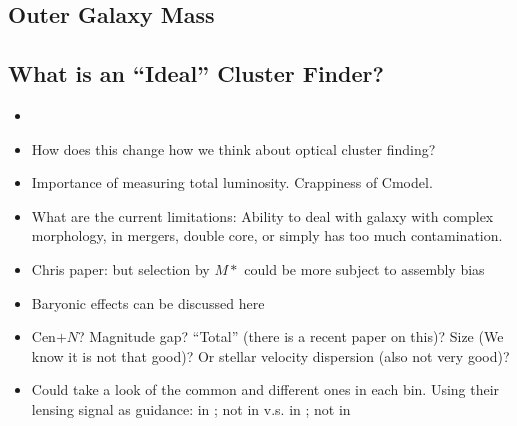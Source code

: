 \documentclass[a4paper,fleqn,usenatbib]{mnras}
\begin{document}
\subsection{Outer Galaxy Mass}
    \label{sec:cause_of_difference}



\subsection{What is an ``Ideal'' Cluster Finder?}
    \label{sec:perfect_finder}


    \begin{itemize}

        \item {}

        \item How does this change how we think about optical cluster finding?

        \item Importance of measuring total luminosity. Crappiness of Cmodel. 
        
        \item What are the current limitations: Ability to deal with galaxy with complex 
            morphology, in mergers, double core, or simply has too much contamination.


        \item Chris paper: but selection by $M*$ could be more subject to assembly bias

        \item Baryonic effects can be discussed here
    
        \item Cen$+N$? Magnitude gap? ``Total'' \mstar{} (there is a recent paper on this)?
            Size (We know it is not that good)? Or stellar velocity dispersion (also not very good)?

        \item Could take a look of the common and different ones in each bin. Using their 
            lensing signal as guidance: in \redm{}; not in \mstar{} v.s. in \mstar{}; not in \redm{}

    \end{itemize}
\end{document}
